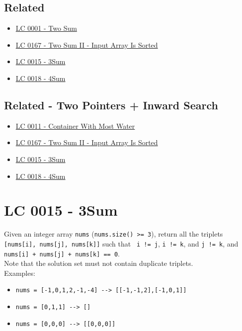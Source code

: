 \subsection*{Related}
\begin{itemize}
\item \hyperref[lc0001]{LC 0001 - Two Sum}
\item \hyperref[lc0167]{LC 0167 - Two Sum II - Input Array Is Sorted}
\item \hyperref[lc0015]{LC 0015 - 3Sum}
\item \hyperref[lc0018]{LC 0018 - 4Sum}
\end{itemize}

\subsection*{Related - Two Pointers + Inward Search}
\begin{itemize}
\item \hyperref[lc0011]{LC 0011 - Container With Most Water}
\item \hyperref[lc0167]{LC 0167 - Two Sum II - Input Array Is Sorted}
\item \hyperref[lc0015]{LC 0015 - 3Sum}
\item \hyperref[lc0018]{LC 0018 - 4Sum}
\end{itemize}

\section{LC 0015 - 3Sum}\label{lc0015}
Given an integer array {\colorbox{CodeBackground}{\lstinline|nums|}} ({\colorbox{CodeBackground}{\lstinline|nums.size() >= 3|}}), return all the triplets {\colorbox{CodeBackground}{\lstinline|[nums[i], nums[j], nums[k]]|}} such that {\colorbox{CodeBackground}{\lstinline| i != j|}}, {\colorbox{CodeBackground}{\lstinline|i != k|}}, and {\colorbox{CodeBackground}{\lstinline|j != k|}}, and {\colorbox{CodeBackground}{\lstinline|nums[i] + nums[j] + nums[k] == 0|}}. \\

Note that the solution set must not contain duplicate triplets.\\

Examples:
\begin{itemize}
\item {\colorbox{CodeBackground}{\lstinline|nums = [-1,0,1,2,-1,-4] --> [[-1,-1,2],[-1,0,1]]|}}
\item {\colorbox{CodeBackground}{\lstinline|nums = [0,1,1] --> []|}}
\item {\colorbox{CodeBackground}{\lstinline|nums = [0,0,0] --> [[0,0,0]]|}}
\end{itemize}

